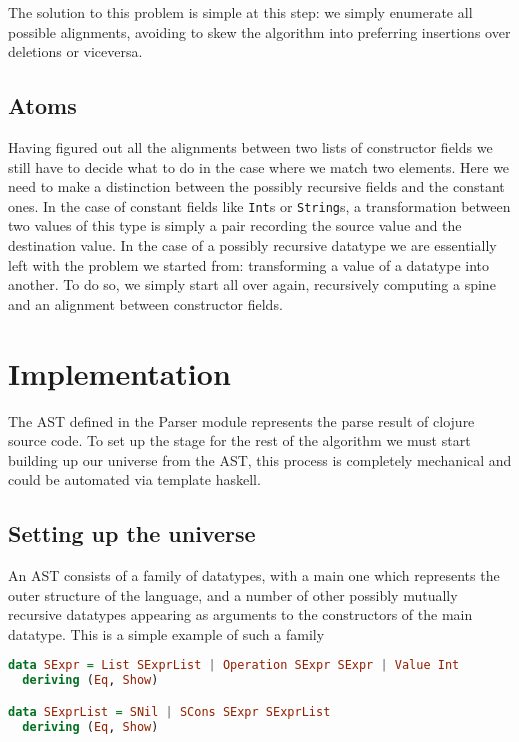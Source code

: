 \documentclass[11pt]{article}
\begin{document}
The solution to this problem is simple at this step: we simply enumerate
all possible alignments, avoiding to skew the algorithm into preferring
insertions over deletions or viceversa.

\subsection{Atoms}\label{atoms}

Having figured out all the alignments between two lists of constructor
fields we still have to decide what to do in the case where we match two
elements. Here we need to make a distinction between the possibly
recursive fields and the constant ones. In the case of constant fields
like \texttt{Int}s or \texttt{String}s, a transformation between two
values of this type is simply a pair recording the source value and the
destination value. In the case of a possibly recursive datatype we are
essentially left with the problem we started from: transforming a value
of a datatype into another. To do so, we simply start all over again,
recursively computing a spine and an alignment between constructor
fields.

\section{Implementation}\label{implementation}

The AST defined in the Parser module represents the parse result of
clojure source code. To set up the stage for the rest of the algorithm
we must start building up our universe from the AST, this process is
completely mechanical and could be automated via template haskell.

\subsection{Setting up the universe}\label{setting-up-the-universe}

An AST consists of a family of datatypes, with a main one which
represents the outer structure of the language, and a number of other
possibly mutually recursive datatypes appearing as arguments to the
constructors of the main datatype. This is a simple example of such a
family

\begin{lstlisting}[language=haskell]
data SExpr = List SExprList | Operation SExpr SExpr | Value Int
  deriving (Eq, Show)

data SExprList = SNil | SCons SExpr SExprList
  deriving (Eq, Show)
\end{lstlisting}
\end{document}
